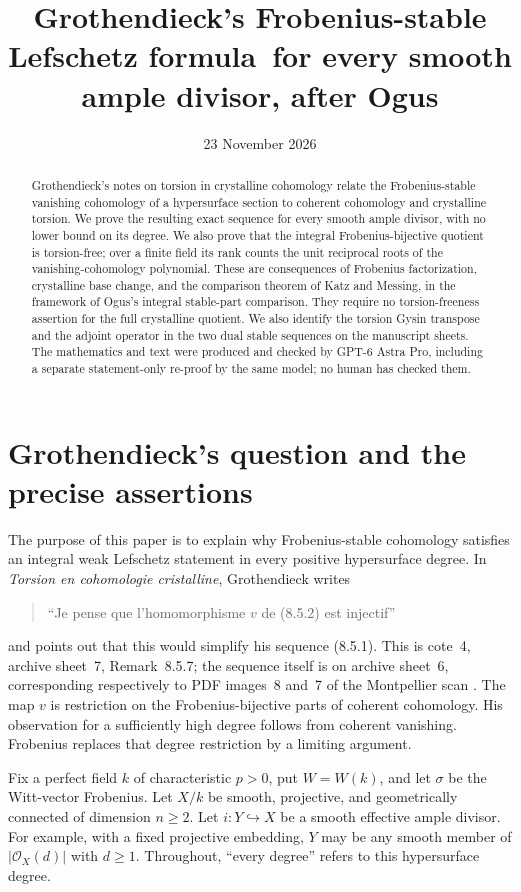 \documentclass[11pt]{article}
\title{Grothendieck's Frobenius-stable Lefschetz formula\ for every smooth ample divisor, after Ogus}
\author{}
\date{23 November 2026}
\theoremstyle{remark}\newtheorem{remark}[theorem]{Remark}
\newcommand{\OO}{\mathcal O}
\begin{document}
\maketitle
\begin{abstract}
Grothendieck's notes on torsion in crystalline cohomology relate the Frobenius-stable vanishing cohomology of a hypersurface section to coherent cohomology and crystalline torsion. We prove the resulting exact sequence for every smooth ample divisor, with no lower bound on its degree. We also prove that the integral Frobenius-bijective quotient is torsion-free; over a finite field its rank counts the unit reciprocal roots of the vanishing-cohomology polynomial. These are consequences of Frobenius factorization, crystalline base change, and the comparison theorem of Katz and Messing, in the framework of Ogus's integral stable-part comparison. They require no torsion-freeness assertion for the full crystalline quotient. We also identify the torsion Gysin transpose and the adjoint operator in the two dual stable sequences on the manuscript sheets. The mathematics and text were produced and checked by GPT-6 Astra Pro, including a separate statement-only re-proof by the same model; no human has checked them.
\end{abstract}

\section{Grothendieck's question and the precise assertions}

The purpose of this paper is to explain why Frobenius-stable cohomology satisfies an integral weak Lefschetz statement in every positive hypersurface degree. In \emph{Torsion en cohomologie cristalline}, Grothendieck writes
\begin{quote}
``Je pense que l'homomorphisme $v$ de (8.5.2) est injectif''
\end{quote}
and points out that this would simplify his sequence (8.5.1). This is cote~4, archive sheet~7, Remark~8.5.7; the sequence itself is on archive sheet~6, corresponding respectively to PDF images~8 and~7 of the Montpellier scan \citep{GrothendieckNotes}. The map $v$ is restriction on the Frobenius-bijective parts of coherent cohomology. His observation for a sufficiently high degree follows from coherent vanishing. Frobenius replaces that degree restriction by a limiting argument.

Fix a perfect field $k$ of characteristic $p>0$, put $W=W(k)$, and let $\sigma$ be the Witt-vector Frobenius. Let $X/k$ be smooth, projective, and geometrically connected of dimension $n\geq2$. Let $i:Y\hookrightarrow X$ be a smooth effective ample divisor. For example, with a fixed projective embedding, $Y$ may be any smooth member of $|\OO_X(d)|$ with $d\geq1$. Throughout, ``every degree'' refers to this hypersurface degree.
\end{document}
